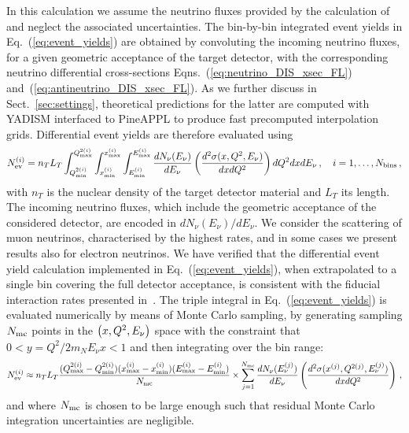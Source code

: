 In this calculation we assume the neutrino fluxes provided by the calculation
of~\cite{Kling:2021gos} and neglect the associated uncertainties.
%
The bin-by-bin integrated event yields in Eq.~(\ref{eq:event_yields}) are
obtained by convoluting the incoming neutrino fluxes, for a given geometric acceptance
of the target detector, with the corresponding neutrino differential cross-sections
Eqns.~(\ref{eq:neutrino_DIS_xsec_FL}) and~(\ref{eq:antineutrino_DIS_xsec_FL}).
%
As we further discuss in Sect.~\ref{sec:settings}, theoretical predictions
for the latter are computed with {\sc\small YADISM} interfaced to {\sc\small PineAPPL}
to produce fast precomputed interpolation grids.
%
Differential event yields are therefore evaluated using
\begin{equation}
  \label{eq:event_yields}
   N_{\rm ev}^{(i)} = n_T L_T\int_{Q^{2(i)}_{\rm min}}^{Q^{2(i)}_{\rm max}}\int_{x^{(i)}_{\rm min}}^{x^{(i)}_{\rm max}}\int_{E_{\rm min}^{(i)}}^{E_{\rm max}^{(i)}} \frac{dN_{\nu}(E_\nu)}{dE_{\nu}}\left(\frac{d^2\sigma(x,Q^2,E_{\nu})}{dxdQ^2}\right) dQ^2 dx dE_{\nu} \, ,\quad i=1,\ldots, N_{\rm bins} \, ,
\end{equation}
with $n_T$ is the nuclear density of the target detector material and $L_T$ its length.
%
The incoming neutrino fluxes, which include the geometric acceptance of the considered detector,
are encoded in $dN_{\nu}(E_\nu)/dE_{\nu}$.
%
We consider the scattering of muon neutrinos, characterised by the highest rates, and in some cases
we present results also for electron neutrinos.
%
We have verified that the differential event yield calculation
implemented in Eq.~(\ref{eq:event_yields}), when extrapolated to a single bin
covering the full detector acceptance,
is consistent with the fiducial interaction rates presented in~\cite{Feng:2022inv}.
%
The triple integral in  Eq.~(\ref{eq:event_yields}) is evaluated numerically by means
of Monte Carlo sampling, by generating sampling $N_{\rm mc}$ points in the $\left( x,Q^2,E_{\nu}\right)$ space
with the constraint that $0 < y = Q^2/2m_N E_{\nu }x <1 $
and then  integrating over the bin range:
\begin{equation}
    N_{\rm ev}^{(i)} \approx n_T L_T \frac{(Q^{2(i)}_{\rm max}-Q^{2(i)}_{\rm min})(x^{(i)}_{\rm max}-x^{(i)}_{\rm min})(E_{\rm max}^{(i)}-E_{\rm min}^{(i)})}{N_{\rm mc}}\times \sum_{j=1}^{N_{\rm mc}} \frac{dN_{\nu}(E^{(j)}_\nu)}{dE_{\nu}}\left(\frac{d^2\sigma(x^{(j)},Q^{2(j)},E^{(j)}_{\nu})}{dxdQ^2}\right) \, ,
    \label{MCintegration}
\end{equation}
and where $N_{\rm mc}$ is chosen to be large enough such that residual Monte Carlo integration
uncertainties are negligible.

